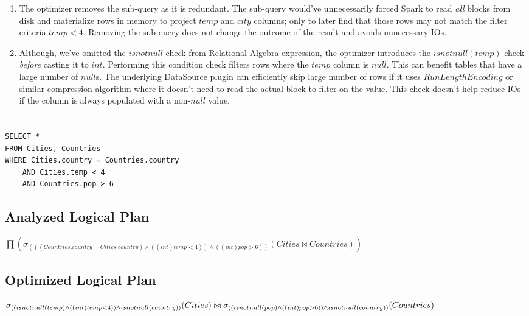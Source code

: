 \documentclass[12pt]{article}
\begin{document}
\begin{enumerate}

\item The optimizer removes the sub-query as it is redundant. The sub-query would've unnecessarily forced Spark to read \textit{all} blocks from disk and materialize rows in memory to project $temp$ and $city$ columns; only to later find that those rows may not match the filter criteria $temp < 4$. Removing the sub-query does not change the outcome of the result and avoids unnecessary IOs.

\item Although, we've omitted the $isnotnull$ check from Relational Algebra expression, the optimizer introduces the $isnotnull(temp)$ check \textit{before} casting it to $int$. Performing this condition check filters rows where the $temp$ column is $null$. This can benefit tables that have a large number of $null$s. The underlying DataSource plugin can efficiently skip large number of rows if it uses $Run Length Encoding$ or similar compression algorithm where it doesn't need to read the actual block to filter on the value. This check doesn't help reduce IOs if the column is always populated with a non-$null$ value.

\end{enumerate}

\newpage

\section{}
\begin{verbatim}
SELECT *
FROM Cities, Countries
WHERE Cities.country = Countries.country
    AND Cities.temp < 4
    AND Countries.pop > 6
\end{verbatim}

\subsection*{Analyzed Logical Plan}

$\prod(\sigma_{(((Countries.country = Cities.country) \wedge ((int)temp < 4))  \wedge ((int)pop > 6))}(Cities \bowtie Countries))$



\subsection*{Optimized Logical Plan}

$\sigma_{((isnotnull(temp) \wedge ((int)temp < 4)) \wedge isnotnull(country))}(Cities) \bowtie \\
\sigma_{((isnotnull(pop) \wedge ((int)pop > 6)) \wedge isnotnull(country))}(Countries)$
\end{document}
